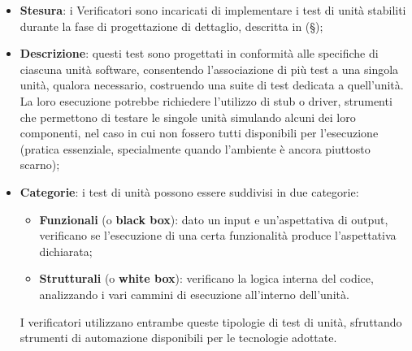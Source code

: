 \documentclass[10pt, a4paper]{article}
\begin{document}
\begin{itemize}
    \item \textbf{Stesura}: i Verificatori sono incaricati di implementare i test di unità stabiliti durante la fase di progettazione di dettaglio, descritta in (\S {});
    \item \textbf{Descrizione}: questi test sono progettati in conformità alle specifiche di ciascuna unità software, consentendo l'associazione di più test a una singola unità, qualora necessario, costruendo una suite di test dedicata a quell'unità.
    La loro esecuzione potrebbe richiedere l'utilizzo di stub o driver, strumenti che permettono di testare le singole unità simulando alcuni dei loro componenti, nel caso in cui non fossero tutti disponibili per l'esecuzione (pratica essenziale, specialmente quando l'ambiente è ancora piuttosto scarno);
    \item \textbf{Categorie}: i test di unità possono essere suddivisi in due categorie:
    \begin{itemize}
        \item \textbf{Funzionali} (o \textbf{black box}): dato un input e un'aspettativa di output, verificano se l'esecuzione di una certa funzionalità produce l'aspettativa dichiarata;
        \item \textbf{Strutturali} (o \textbf{white box}): verificano la logica interna del codice, analizzando i vari cammini di esecuzione all'interno dell'unità.
    \end{itemize}
    I verificatori utilizzano entrambe queste tipologie di test di unità, sfruttando strumenti di automazione disponibili per le tecnologie adottate. 
\end{itemize}




\end{document}
